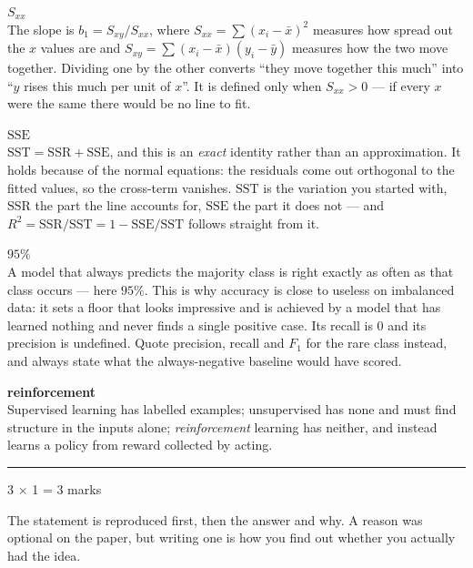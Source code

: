 \documentclass[10pt,a4paper]{article}
\newcommand{\parthead}[2]{\vspace{2pt}\noindent\rule{\linewidth}{0.4pt}\par\vspace{2pt}%
  \noindent{\bfseries Part #1}\hfill{\small #2}\par\vspace{1pt}}
\newcommand{\sol}[1]{\textbf{#1}}
\begin{document}
\begin{sB}

  \item \sol{$S_{xx}$}\\ The slope is $b_1 = S_{xy}/S_{xx}$, where $S_{xx} = \sum(x_i - \bar x)^2$ measures how spread out the $x$ values are and $S_{xy} = \sum(x_i - \bar x)(y_i - \bar y)$ measures how the two move together. Dividing one by the other converts ``they move together this much'' into ``$y$ rises this much per unit of $x$''. It is defined only when $S_{xx} > 0$ --- if every $x$ were the same there would be no line to fit.

  \item \sol{$\mathrm{SSE}$}\\ $\mathrm{SST} = \mathrm{SSR} + \mathrm{SSE}$, and this is an \emph{exact} identity rather than an approximation. It holds because of the normal equations: the residuals come out orthogonal to the fitted values, so the cross-term vanishes. $\mathrm{SST}$ is the variation you started with, $\mathrm{SSR}$ the part the line accounts for, $\mathrm{SSE}$ the part it does not --- and $R^2 = \mathrm{SSR}/\mathrm{SST} = 1 - \mathrm{SSE}/\mathrm{SST}$ follows straight from it.

  \item \sol{$95\%$}\\ A model that always predicts the majority class is right exactly as often as that class occurs --- here $95\%$. This is why accuracy is close to useless on imbalanced data: it sets a floor that looks impressive and is achieved by a model that has learned nothing and never finds a single positive case. Its recall is $0$ and its precision is undefined. Quote precision, recall and $F_1$ for the rare class instead, and always state what the always-negative baseline would have scored.

  \item \sol{reinforcement}\\ Supervised learning has labelled examples; unsupervised has none and must find structure in the inputs alone; \emph{reinforcement} learning has neither, and instead learns a policy from reward collected by acting.

\end{sB}

\newpage

\parthead{C --- True or false}{3 $\times$ 1 = 3 marks}

{\small The statement is reproduced first, then the answer and why. A reason was optional on the paper, but writing one is how you find out whether you actually had the idea.}
\end{document}
